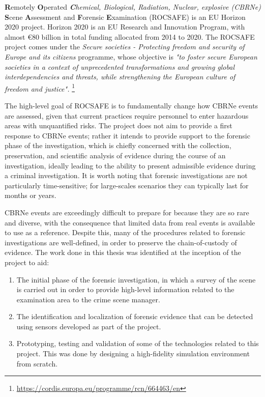 \textbf{R}emotely \textbf{O}perated \textit{\textbf{C}hemical, Biological, Radiation, Nuclear, explosive (CBRNe)} \textbf{S}cene \textbf{A}ssessment and \textbf{F}orensic \textbf{E}xamination (ROCSAFE) is an EU Horizon 2020 project. Horizon 2020 is an EU Research and Innovation Program, with almost €80 billion in total funding allocated from 2014 to 2020. The ROCSAFE project comes under the \textit{Secure societies - Protecting freedom and security of Europe and its citizens} programme, whose objective is \textit{"to foster secure European societies in a context of unprecedented transformations and growing global interdependencies and threats, while strengthening the European culture of freedom and justice".}
\href{https://cordis.europa.eu/programme/rcn/664463/en}{}\footnote{\href {https://cordis.europa.eu/programme/rcn/664463/en}{https://cordis.europa.eu/programme/rcn/664463/en}}

The high-level goal of ROCSAFE is to fundamentally change how CBRNe events are assessed, given that current practices require personnel to enter hazardous areas with unquantified risks. The project does not aim to provide a first response to CBRNe events; rather it intends to provide support to the forensic phase of the investigation, which is chiefly concerned with the collection, preservation, and scientific analysis of evidence during the course of an investigation, ideally leading to the ability to present admissible evidence during a criminal investigation. It is worth noting that forensic investigations are not particularly time-sensitive; for large-scales scenarios they can typically last for months or years.\par


CBRNe events are exceedingly difficult to prepare for because they are so rare and diverse, with the consequence that limited data from real events is available to use as a reference. Despite this, many of the procedures related to forensic investigations are well-defined, in order to preserve the chain-of-custody of evidence. The work done in this thesis was identified at the inception of the project to aid: 
\begin{enumerate}
    \item The initial phase of the forensic investigation, in which a survey of the scene is carried out in order to provide high-level information related to the examination area to the crime scene manager.
    \item The identification and localization of forensic evidence that can be detected using sensors developed as part of the project.
    \item Prototyping, testing and validation of some of the technologies related to this project. This was done by designing a high-fidelity simulation environment from scratch.
\end{enumerate}



